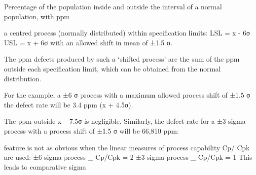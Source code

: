  
Percentage of the population inside and outside the interval of a normal population, with ppm
 

a centred process (normally distributed) within specification limits: LSL = x - 6σ USL = x + 6σ with an allowed shift in mean of ±1.5 σ.

The ppm defects produced by such a ‘shifted process’ are the sum of
the ppm outside each specification limit, which can be obtained from the
normal distribution. 

For the example, a ±6 σ process with a maximum allowed process shift of ±1.5 σ the defect rate will be 3.4 ppm (x + 4.5σ). 

The ppm outside x – 7.5σ is negligible. Similarly, the defect rate for a ±3 sigma process with a process shift of ±1.5 σ will be 66,810 ppm:

feature is not as obvious when the linear measures of process capability Cp/
Cpk are used:
±6 sigma process _ Cp/Cpk = 2
±3 sigma process _ Cp/Cpk = 1
This leads to comparative sigma
